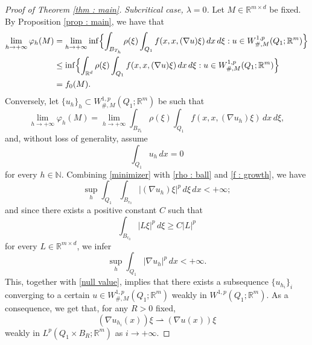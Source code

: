 \documentclass{article}
\theoremstyle{definition}
\newcommand{\f}{\varphi}
\newcommand{\N}{\mathbb{N}}
\newcommand{\R}{\mathbb{R}}
\begin{document}
\begin{proof}[Proof of Theorem \ref{thm : main}]
\medskip

{\em Subcritical case, $\lambda=0$.} Let $M\in \R^{m\times d}$ be fixed. By Proposition \ref{prop : main}, we have that
\begin{align*}
    \lim _{h\to+\infty}\f_h(M) & = \lim_{h\to+\infty}\inf\Bigl\{ \int_{B_{T_h}} \rho(\xi)\int_{Q_1} f(x,x,(\nabla u ) \xi)\, dx\,d\xi : u\in W^{1,p}_{\#,M}(Q_1; \R^m) \Bigr\} \\
    & \leq \inf\Bigl\{ \int_{\R^d} \rho(\xi)\int_{Q_1} f(x,x,(\nabla u ) \xi)\, dx\,d\xi : u\in W^{1,p}_{\#,M}(Q_1; \R^m) \Bigr\} \\
    & = f_0(M).
\end{align*}
Conversely, let $\{u_h\}_h\subset W^{1,p}_{\#,M}(Q_1; \R^m)$ be such that
\begin{equation}\label{minimizer}
   \lim _{h\to+\infty} \f_h(M)  = \lim_{h\to+\infty}  \int_{B_{T_h}} \rho(\xi)\int_{Q_1} f(x,x,(\nabla u_h ) \xi)\, dx\,d\xi,
\end{equation}
and, without loss of generality, assume
\begin{equation}\label{null value}
\int_{Q_1}u_h\,dx=0   
\end{equation}
for every $h\in\N$. Combining \eqref{minimizer} with \eqref{rho : ball} and \eqref{f : growth}, we have
\begin{equation*}
     \sup_h \int_{Q_1} \int_{B_{r_0}}|(\nabla u_h ) \xi|^p\,d\xi\, dx<+\infty;
\end{equation*}
and since there exists a positive constant $C$ such that 
\begin{equation*}
    \int_{B_{r_0}}|L\xi|^p\,d\xi \geq C|L|^p
\end{equation*}
for every $L\in \R^{m\times d}$, we infer
\begin{equation*}
     \sup_h \int_{Q_1} |\nabla u_h|^p\, dx< +\infty.
\end{equation*}
This, together with \eqref{null value}, implies that there exists a subsequence $\{u_{h_i}\}_i$ converging to a certain $u\in W^{1,p}_{\#,M}(Q_1; \R^m)$ weakly in $W^{1,p}(Q_1;\R^m)$. As a consequence, we get that, for any $R>0$ fixed, 
\begin{equation*}
    (\nabla u_{h_i}(x))\xi \rightharpoonup (\nabla u(x))\xi 
\end{equation*}
weakly in $L^p(Q_1\times B_R;\R^m)$ as $i\to+\infty$.


\end{proof}
\end{document}
